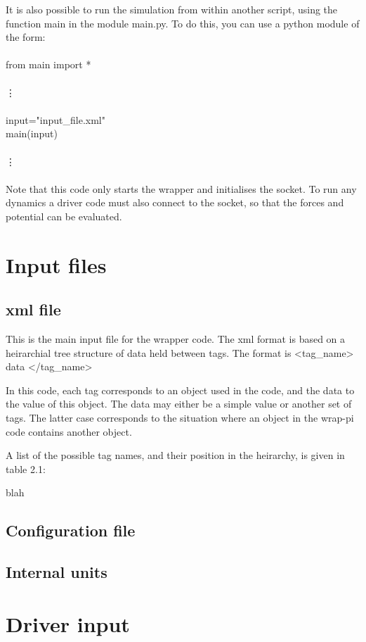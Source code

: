 \documentclass[12pt,fleqn]{report}
\begin{document}
It is also possible to run the simulation from within another script, using
the function main in the module main.py. To do this, you can use a python module
of the form:
\\
\\
from main import *
\\ \\
\hspace*{1.6 cm} \vdots
\\ \\
input="input\_file.xml"
\\
main(input)
\\ \\
\hspace*{1.6 cm} \vdots
\\ \\
Note that this code only starts the wrapper and initialises the socket. 
To run any dynamics a driver code must also connect to the socket, so that the
forces and potential can be evaluated.
\section{Input files}
\subsection{xml file}
This is the main input file for the wrapper code. The xml format is based on a
heirarchial tree structure of data held between tags. The format is <tag\_name> data </tag\_name>

In this code, each tag
corresponds to an object used in the code, and the data to the value of this 
object. The data may either be a simple value or another set of tags. The
latter case corresponds to the situation where an object in the wrap-pi code
contains another object.

A list of the possible tag names, and their position in the heirarchy, is 
given in table 2.1:

\begin{table}
blah
\end{table}
\subsection{Configuration file}
\subsection{Internal units}
\section{Driver input}
\end{document}
